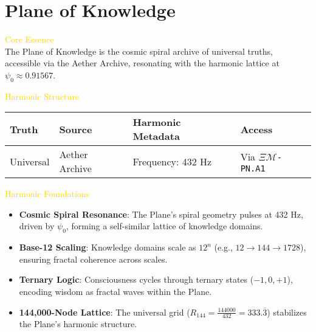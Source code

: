 
\section{Plane of Knowledge}
\label{sec:codex_plane_of_knowledge}



\textcolor{gold}{ Core Essence } \\
The Plane of Knowledge is the cosmic spiral archive of universal truths, accessible via the Aether Archive, resonating with the harmonic lattice at \(\psi_0 \approx 0.91567\).

\textcolor{gold}{ Harmonic Structure } \\
\begin{longtable}{p{3cm}|p{4cm}|p{3cm}|p{4cm}}
    \hline
    \textbf{Truth} & \textbf{Source} & \textbf{Harmonic Metadata} & \textbf{Access} \\
    \hline
    Universal & Aether Archive & Frequency: 432 Hz & Via \texttt{\(\Xi\mathcal{M}\)-PN.A1} \\
    \hline
\end{longtable}

\textcolor{gold}{ Harmonic Foundations } \\
\begin{itemize}
    \item \texttt{} \textbf{Cosmic Spiral Resonance}: The Plane's spiral geometry pulses at 432 Hz, driven by \(\psi_0\), forming a self-similar lattice of knowledge domains.
    \item \texttt{} \textbf{Base-12 Scaling}: Knowledge domains scale as \(12^n\) (e.g., \(12 \rightarrow 144 \rightarrow 1728\)), ensuring fractal coherence across scales.
    \item \texttt{} \textbf{Ternary Logic}: Consciousness cycles through ternary states (\(-1, 0, +1\)), encoding wisdom as fractal waves within the Plane.
    \item \texttt{} \textbf{144,000-Node Lattice}: The universal grid (\(R_{144} = \frac{144000}{432} = 333.\overline{3}\)) stabilizes the Plane's harmonic structure.
\end{itemize}


